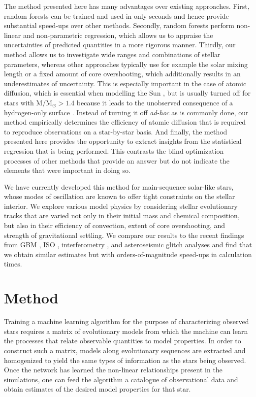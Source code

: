 \documentclass[iop,apj,twocolappendix]{emulateapj}
\begin{document}
The method presented here has many advantages over existing approaches. First, random forests can be trained and used in only seconds and hence provide substantial speed-ups over other methods. 
Secondly, random forests perform non-linear and non-parametric regression, which %
allows us to appraise the uncertainties of predicted quantities in a more rigorous manner. 
Thirdly, our method allows us to investigate wide ranges and combinations of stellar parameters, whereas other approaches typically use for example the solar mixing length or a fixed amount of core overshooting, which additionally results in an underestimates of uncertainty. This is especially important in the case of atomic diffusion, which is essential when modelling the Sun \citep[see e.g.][]{1994MNRAS.269.1137B}, but is usually turned off for stars with M/M$_\odot > 1.4$ because it leads to the unobserved consequence of a hydrogen-only surface \citep{2002A&A...390..611M}. Instead of turning it off \emph{ad-hoc} as is commonly done, our method empirically determines the efficiency of atomic diffusion that is required to reproduce observations on a star-by-star basis. 
And finally, the method presented here provides the opportunity to extract insights from the statistical regression that is being performed. This contrasts the blind optimization processes of other methods that provide an answer but do not indicate the elements that were important in doing so. 

We have currently developed this method for main-sequence solar-like stars, whose modes of oscillation are known to offer tight constraints on the stellar interior. We explore various model physics by considering stellar evolutionary tracks that are varied not only in their initial mass and chemical composition, but also in their efficiency of convection, extent of core overshooting, and strength of gravitational settling. We compare our results to the recent findings from GBM \citep{2015MNRAS.452.2127S}, ISO \citep{2015ApJ...811L..37M}, interferometry \citep{2013MNRAS.433.1262W}, and asteroseismic glitch analyses \citep{2014ApJ...790..138V} and find that we obtain similar estimates but with orders-of-magnitude speed-ups in calculation times. 


\section{Method} \label{sec:Method} 
Training a machine learning algorithm for the purpose of characterizing observed stars requires a matrix of evolutionary models from which the machine can learn the processes that relate observable quantities to model properties. In order to construct such a matrix, models along evolutionary sequences are extracted and homogenized to yield the same types of information as the stars being observed. Once the network has learned the non-linear relationships present in the simulations, one can feed the algorithm a catalogue of observational data and obtain estimates of the desired model properties for that star. 
\end{document}
